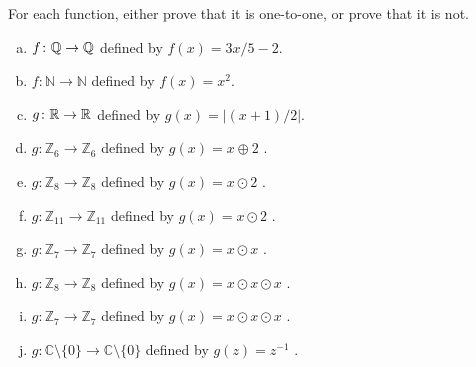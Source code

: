 \begin{exercise}{40} 
For each function, either prove that it is one-to-one, or prove that it is not.
\begin{enumerate}[(a)]
\item \label{IsIt11?-linear}
 $f \colon \mathbb{Q} \to \mathbb{Q}$ defined by $f(x)=3x/5 - 2$.
\item \label{IsIt11?-square}
 $f \colon {\mathbb N} \to {\mathbb N}$ defined by $f(x)=x^2$.
\item \label{IsIt11?-abs}
 $g \colon \mathbb{R} \to \mathbb{R}$ defined by $g(x)= \left|(x+1)/2 \right|$.
\item \label{modular_g}
 $g \colon {\mathbb Z}_6 \to {\mathbb Z}_6$ defined by $g(x)= x \oplus 2$ .
\item \label{modular_m}
 $g \colon {\mathbb Z}_8 \to {\mathbb Z}_8$ defined by $g(x) = x \odot 2 $ .
\item \label{modular_m2}
 $g \colon {\mathbb Z}_{11} \to {\mathbb Z}_{11}$ defined by $g(x) =  x \odot 2$ .
\item 
 $g \colon {\mathbb Z}_7 \to {\mathbb Z}_7$ defined by $g(x)= x \odot x$ .
\item 
 $g \colon {\mathbb Z}_8 \to {\mathbb Z}_8$ defined by $g(x)= x \odot x \odot x$ .
\item 
 $g \colon {\mathbb Z}_7 \to {\mathbb Z}_7$ defined by $g(x)= x \odot x \odot x$ .
\item
 $g \colon {\mathbb C}\setminus \{0\}  \to {\mathbb C}\setminus \{0\} $ defined by $g(z) =  z^{-1}$ .
 \end{enumerate}
\end{exercise}



